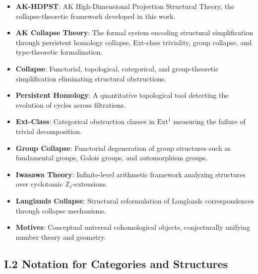 \documentclass[11pt]{article}
\begin{document}
\begin{itemize}
    \item \textbf{AK-HDPST}: AK High-Dimensional Projection Structural Theory, the collapse-theoretic framework developed in this work.
    \item \textbf{AK Collapse Theory}: The formal system encoding structural simplification through persistent homology collapse, Ext-class triviality, group collapse, and type-theoretic formalization.
    \item \textbf{Collapse}: Functorial, topological, categorical, and group-theoretic simplification eliminating structural obstructions.
    \item \textbf{Persistent Homology}: A quantitative topological tool detecting the evolution of cycles across filtrations.
    \item \textbf{Ext-Class}: Categorical obstruction classes in $\mathrm{Ext}^1$ measuring the failure of trivial decomposition.
    \item \textbf{Group Collapse}: Functorial degeneration of group structures such as fundamental groups, Galois groups, and automorphism groups.
    \item \textbf{Iwasawa Theory}: Infinite-level arithmetic framework analyzing structures over cyclotomic $\mathbb{Z}_\ell$-extensions.
    \item \textbf{Langlands Collapse}: Structural reformulation of Langlands correspondences through collapse mechanisms.
    \item \textbf{Motives}: Conceptual universal cohomological objects, conjecturally unifying number theory and geometry.
\end{itemize}

\subsection*{I.2 Notation for Categories and Structures}
\end{document}
